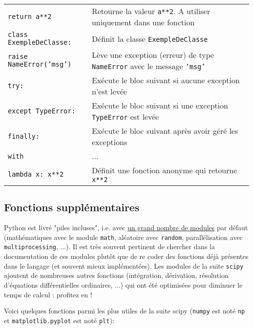 \documentclass{article}
\begin{document}
\begin{tabular}{|l|l|}
    \texttt{return a**2}            & Retourne la valeur \texttt{a**2}. A utiliser uniquement dans une fonction\\
    \texttt{class ExempleDeClasse:} & Définit la classe \texttt{ExempleDeClasse}\\
    \texttt{raise NameError('msg')} & Lève une exception (erreur) de type \texttt{NameError} avec le message \texttt{'msg'}\\
    \texttt{try:}                   & Exécute le bloc suivant si aucune exception n'est levée\\
    \texttt{except TypeError:}      & Exécute le bloc suivant si une exception \texttt{TypeError} est levée\\
    \texttt{finally:}               & Exécute le bloc suivant après avoir géré les exceptions\\
    \texttt{with}                   & ...\\
    \texttt{lambda x: x**2}         & Définit une fonction anonyme qui retourne \texttt{x**2}\\
    \hline
\end{tabular}

\subsection*{Fonctions supplémentaires}

Python est livré "piles incluses", i.e. avec \href{https://docs.python.org/3/py-modindex.html}{un grand nombre de modules} par défaut (mathématiques avec le module \texttt{math}, aléatoire avec \texttt{random}, parallélisation avec \texttt{multiprocessing}, ...). Il est très souvent pertinent de chercher dans la documentation de ces modules plutôt que de re coder des fonctions déjà présentes dans le langage (et souvent mieux implémentées). Les modules de la suite \texttt{scipy} ajoutent de nombreuses autres fonctions (intégration, dérivation, résolution d'équations différentielles ordinaires, ...) qui ont été optimisées pour diminuer le temps de calcul : profitez en !

Voici quelques fonctions parmi les plus utiles de la suite scipy (\texttt{numpy} est noté \texttt{np} et \texttt{matplotlib.pyplot} est noté \texttt{plt}):
\end{document}
